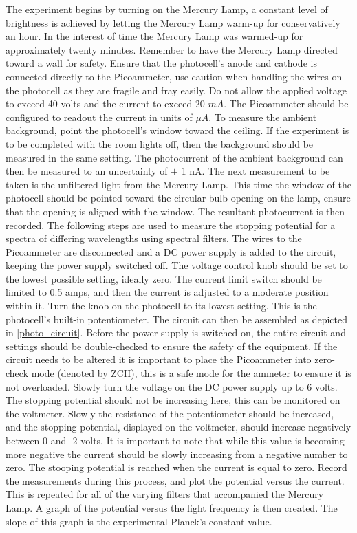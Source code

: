 \documentclass[a4paper]{article}
\begin{document}
\qq The experiment begins by turning on the Mercury Lamp, a constant
level of brightness is achieved by letting the Mercury Lamp warm-up
for conservatively an hour. In the interest of time the Mercury Lamp
was warmed-up for approximately twenty minutes. Remember to have the
Mercury Lamp directed toward a wall for safety. Ensure that the
photocell's anode and cathode is connected directly to the
Picoammeter, use caution when handling the wires on the photocell as
they are fragile and fray easily. Do not allow the applied voltage to
exceed 40 volts and the current to exceed 20 $mA$. The
Picoammeter should be configured to readout the current in units of
$\mu A$. To measure the ambient background, point the photocell's
window toward the ceiling. If the experiment is to be completed with
the room lights off, then the background should be measured in the
same setting. The photocurrent of the ambient background can then be
measured to an uncertainty of $\pm$ 1 nA. The next measurement to
be taken is the unfiltered light from the Mercury Lamp. This time the
window of the photocell should be pointed toward the circular bulb
opening on the lamp, ensure that the opening is aligned with the
window. The resultant photocurrent is then recorded. The following
steps are used to measure the stopping potential for a spectra of
differing wavelengths using spectral filters. The wires to the
Picoammeter are disconnected and a DC power supply is added to the
circuit, keeping the power supply switched off. The voltage control
knob should be set to the lowest possible setting, ideally zero. The
current limit switch should be limited to 0.5 amps, and then the
current is adjusted to a moderate position within it. Turn the knob on
the photocell to its lowest setting. This is the photocell's built-in
potentiometer. The circuit can then be assembled as depicted in
\ref{photo_circuit}. Before the power supply is switched on, the
entire circuit and settings should be double-checked to ensure the
safety of the equipment. If the circuit needs to be altered it is
important to place the Picoammeter into zero-check mode (denoted by
ZCH), this is a safe mode for the ammeter to ensure it is not
overloaded. Slowly turn the voltage on the DC power supply up to 6
volts. The stopping potential should not be increasing here, this can
be monitored on the voltmeter. Slowly the resistance of the
potentiometer should be increased, and the stopping potential,
displayed on the voltmeter, should increase negatively between 0 and
-2 volts. It is important to note that while this value is becoming
more negative the current should be slowly increasing from a negative
number to zero. The stooping potential is reached when the current is
equal to zero. Record the measurements during this process, and plot
the potential versus the current. This is repeated for all of the
varying filters that accompanied the Mercury Lamp. A graph of the
potential versus the light frequency is then created. The slope of
this graph is the experimental Planck's constant value.
\end{document}
